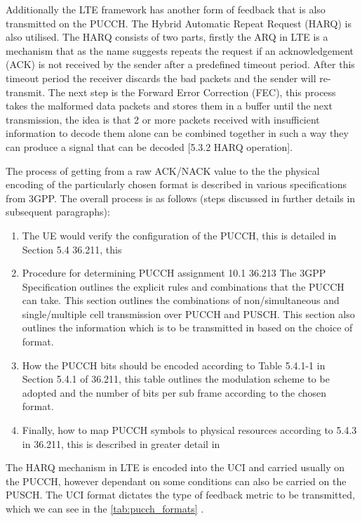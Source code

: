 \documentclass{article}
\begin{document}
Additionally the LTE framework has another form of feedback that is also transmitted on the PUCCH. The Hybrid Automatic Repeat Request (HARQ) is also utilised. The HARQ consists of two parts, firstly the ARQ in LTE is a mechanism that as the name suggests repeats the request if an acknowledgement (ACK) is not received by the sender after a predefined timeout period.  After this timeout period the receiver discards the bad packets and the sender will re-transmit. The next step is the Forward Error Correction (FEC), this process takes the malformed data packets and stores them in a buffer until the next transmission, the idea is that 2 or more packets received with insufficient information to decode them alone can be combined together in such a way they can produce a signal that can be decoded \cite{3gpp36321}[5.3.2 HARQ operation].

The process of getting from a raw ACK/NACK value to the  the physical encoding of the particularly chosen format is described in various specifications from 3GPP. The overall process is as follows (steps discussed in further details in subsequent paragraphs):
\begin{enumerate}\label{proc_pucch_configs}
    \item The UE would verify the configuration of the PUCCH, this is detailed in Section 5.4 36.211, this 
    \item Procedure for determining PUCCH assignment 10.1 36.213 The 3GPP Specification outlines the explicit rules and combinations that the PUCCH can take. This section outlines the combinations of non/simultaneous and single/multiple cell transmission over PUCCH and PUSCH. This section also outlines the information which is to be transmitted in based on the choice of format. 
    \item How the PUCCH bits should be encoded according to Table 5.4.1-1 in Section 5.4.1 of 36.211, this table outlines the modulation scheme to be adopted and the number of bits per sub frame according to the chosen format.
    \item Finally, how to map PUCCH symbols to physical resources according to 5.4.3 in 36.211, this is described in greater detail in  
\end{enumerate} 
The HARQ mechanism in LTE is encoded into the UCI and carried usually on the PUCCH, however dependant on some conditions can also be carried on the PUSCH. The UCI format dictates the type of feedback metric to be transmitted, which we can see in the \cref{tab:pucch_formats} \cite[Section 17.3.1.2]{umts_sesia}. 
\end{document}
